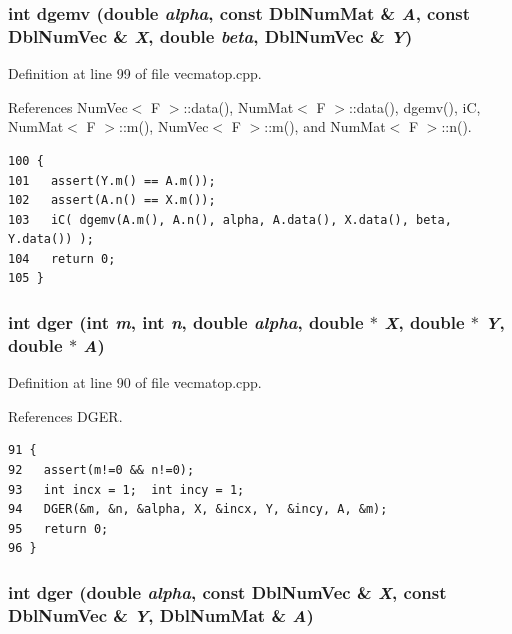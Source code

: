 \subsubsection{\setlength{\rightskip}{0pt plus 5cm}int dgemv (double {\em alpha}, const {\bf Dbl\-Num\-Mat} \& {\em A}, const {\bf Dbl\-Num\-Vec} \& {\em X}, double {\em beta}, {\bf Dbl\-Num\-Vec} \& {\em Y})}\label{vecmatop_8hpp_1f65eba330c9ba99a02f9ec4ecdc51ef_1f65eba330c9ba99a02f9ec4ecdc51ef}




Definition at line 99 of file vecmatop.cpp.

References Num\-Vec$<$ F $>$::data(), Num\-Mat$<$ F $>$::data(), dgemv(), i\-C, Num\-Mat$<$ F $>$::m(), Num\-Vec$<$ F $>$::m(), and Num\-Mat$<$ F $>$::n().

\footnotesize\begin{verbatim}100 {
101   assert(Y.m() == A.m());
102   assert(A.n() == X.m());
103   iC( dgemv(A.m(), A.n(), alpha, A.data(), X.data(), beta, Y.data()) );
104   return 0;
105 }
\end{verbatim}\normalsize 


\subsubsection{\setlength{\rightskip}{0pt plus 5cm}int dger (int {\em m}, int {\em n}, double {\em alpha}, double $\ast$ {\em X}, double $\ast$ {\em Y}, double $\ast$ {\em A})}\label{vecmatop_8hpp_f8ede744e4705c3d338ad70b5b4f5eef_f8ede744e4705c3d338ad70b5b4f5eef}




Definition at line 90 of file vecmatop.cpp.

References DGER.

\footnotesize\begin{verbatim}91 {
92   assert(m!=0 && n!=0);
93   int incx = 1;  int incy = 1;
94   DGER(&m, &n, &alpha, X, &incx, Y, &incy, A, &m);
95   return 0;
96 }
\end{verbatim}\normalsize 


\subsubsection{\setlength{\rightskip}{0pt plus 5cm}int dger (double {\em alpha}, const {\bf Dbl\-Num\-Vec} \& {\em X}, const {\bf Dbl\-Num\-Vec} \& {\em Y}, {\bf Dbl\-Num\-Mat} \& {\em A})}\label{vecmatop_8hpp_a7e716e5ac5169dc959018df48f6aafa_a7e716e5ac5169dc959018df48f6aafa}




